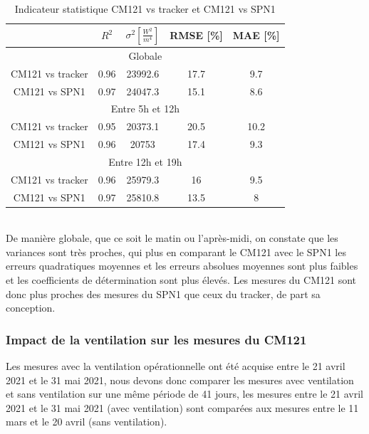 \documentclass[12pt,a4paper]{article}
\begin{document}
\begin{flushleft}
\begin{table}[H]
\begin{center}
\begin{tabular}{ |c|c|c|c|c| } 
 \hline
  & $R^2$ & $\sigma ^2 [\frac{W^2}{m^4}]$ & RMSE [\%] & MAE [\%] \\ 
  \hline
  \multicolumn{5}{|c|}{Globale} \\
  \hline
 CM121 vs tracker & 0.96 & 23992.6 & 17.7 & 9.7\\ 
 \hline
 CM121 vs SPN1 & 0.97 & 24047.3 & 15.1 & 8.6 \\ 
 \hline
  \multicolumn{5}{|c|}{Entre 5h et 12h} \\
  \hline
   CM121 vs tracker & 0.95 & 20373.1 & 20.5 & 10.2\\ 
 \hline
 CM121 vs SPN1 & 0.96 & 20753 & 17.4 & 9.3 \\
 \hline
  \multicolumn{5}{|c|}{Entre 12h et 19h} \\
  \hline 
   CM121 vs tracker & 0.96 & 25979.3 & 16 & 9.5\\ 
 \hline
 CM121 vs SPN1 & 0.97 & 25810.8 & 13.5 & 8 \\
 \hline
\end{tabular}
\caption{Indicateur statistique CM121 vs tracker et CM121 vs SPN1}
\end{center}
\end{table}

~\\
De manière globale, que ce soit le matin ou l'après-midi, on constate que les variances sont très proches, qui plus en comparant le CM121 avec le SPN1 les erreurs quadratiques moyennes et les erreurs absolues moyennes sont plus faibles et les coefficients de détermination sont plus élevés. Les mesures du CM121 sont donc plus proches des mesures du SPN1 que ceux du tracker, de part sa conception. \\



\subsubsection{Impact de la ventilation sur les mesures du CM121}

Les mesures avec la ventilation opérationnelle ont été acquise entre le 21 avril 2021 et le 31 mai 2021, nous devons donc comparer les mesures avec ventilation et sans ventilation sur une même période de 41 jours, les mesures entre le 21 avril 2021 et le 31 mai 2021 (avec ventilation) sont comparées aux mesures entre le 11 mars et le 20 avril (sans ventilation).


\end{flushleft}
\end{document}
